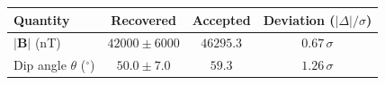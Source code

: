 \begin{tabular}{lccc}
  \hline
  Quantity & Recovered & Accepted & Deviation ($|\Delta|/\sigma$) \\
  \hline
  $|\mathbf{B}|$ (nT) & $42000 \pm 6000$ & $46295.3$ & $0.67\,\sigma$ \\
  Dip angle $\theta$ ($^\circ$) & $50.0 \pm 7.0$ & $59.3$ & $1.26\,\sigma$ \\
  \hline
\end{tabular}